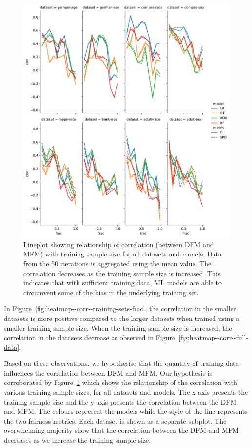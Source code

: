 \documentclass[sigconf]{acmart}
\begin{document}
\begin{figure}
  \centering
  \includegraphics[width=0.8\linewidth]{lineplot--frac--corr.pdf}
  \caption{Lineplot showing relationship of correlation (between DFM
    and MFM) with training sample size for all datasets and models.
    Data from the 50 iterations is aggregated using the mean value.
    The correlation decreases as the training sample size is
    increased. This indicates that with sufficient training data, ML
    models are able to circumvent some of the bias in the underlying
    training set.}
  \label{fig:lineplot--frac--corr}
\end{figure}

In Figure \ref{fig:heatmap--corr--training-sets-frac}, the correlation
in the smaller datasets is more positive compared to the larger
datasets when trained using a smaller training sample size. When the
training sample size is increased, the correlation in the datasets
decrease as observed in Figure \ref{fig:heatmap--corr--full-data}.

Based on these observations, we hypothesise that the quantity of
training data influences the correlation between DFM and MFM. Our
hypothesis is corroborated by Figure \ref{fig:lineplot--frac--corr}
which shows the relationship of the correlation with various training
sample sizes, for all datasets and models. The x-axis presents the
training sample size and the y-axis presents the correlation between
the DFM and MFM. The colours represent the models while the style of
the line represents the two fairness metrics. Each dataset is shown as
a separate subplot. The overwhelming majority show that the
correlation between the DFM and MFM decreases as we increase the
training sample size.
\end{document}
